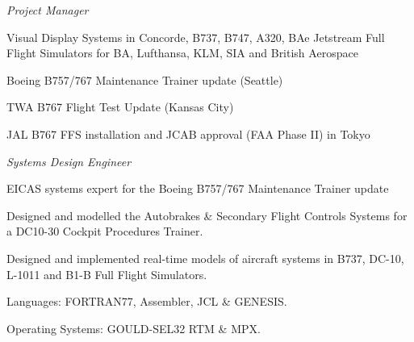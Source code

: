 \documentclass[10pt]{article}
\newenvironment{outerlist}[1][\enskip\textbullet]%
        {\begin{itemize}[#1]}{\end{itemize}%
         \vspace{-.6\baselineskip}}
\newenvironment{innerlist}[1][\enskip\textbullet]%
        {\begin{compactitem}[#1]}{\end{compactitem}}
\newcommand{\blankline}{\quad\pagebreak[2]}
\begin{document}
\begin{outerlist}
\item[] \textit{Project Manager}%
	\begin{innerlist}
	\item Visual Display Systems in Concorde, B737, B747, A320, BAe Jetstream Full Flight Simulators for BA, Lufthansa, KLM, SIA and British Aerospace
	\item Boeing B757/767 Maintenance Trainer update (Seattle)
	\item TWA B767 Flight Test Update (Kansas City)
	\item JAL B767 FFS installation and JCAB approval (FAA Phase II) in Tokyo
	\end{innerlist}

\item[] \textit{Systems Design Engineer} %
	\begin{innerlist}
	\item EICAS systems expert for the Boeing B757/767 Maintenance Trainer update
	\item Designed and modelled the Autobrakes \& Secondary Flight Controls Systems for a DC10-30 Cockpit Procedures Trainer.
	\item Designed and implemented real-time models of aircraft systems in B737, DC-10, L-1011 and B1-B Full Flight Simulators.
	\item Languages: FORTRAN77, Assembler, JCL \& GENESIS.
	\item Operating Systems: GOULD-SEL32 RTM \& MPX.
	\end{innerlist}
\end{outerlist}

\blankline

%
%
%
\newpage
\end{document}
